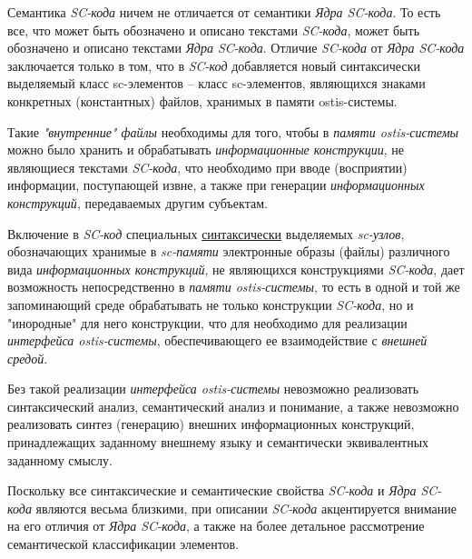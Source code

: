 \begin{SCn}
{{Семантика \textit{SC-кода} ничем не отличается от семантики \textit{Ядра SC-кода}. То есть все, что может быть обозначено и описано текстами \textit{SC-кода}, может быть обозначено и описано текстами \textit{Ядра SC-кода}. Отличие \textit{SC-кода} от \textit{Ядра SC-кода} заключается только в том, что в \textit{SC-код} добавляется новый синтаксически выделяемый класс sc-элементов -- класс sc-элементов, являющихся знаками конкретных (константных) файлов, хранимых в памяти ostis-системы. 

Такие \textit{"внутренние"{} файлы} необходимы для того, чтобы в \textit{памяти ostis-системы} можно было хранить и обрабатывать \textit{информационные конструкции}, не являющиеся текстами \textit{SC-кода}, что необходимо при вводе (восприятии) информации, поступающей извне, а также при генерации \textit{информационных конструкций}, передаваемых другим субъектам. 

Включение в \textit{SC-код} специальных \uline{синтаксически} выделяемых \textit{sc-узлов}, обозначающих хранимые в \textit{sc-памяти} электронные образы (файлы) различного вида \textit{информационных конструкций}, не являющихся конструкциями \textit{SC-кода}, дает возможность непосредственно в \textit{памяти ostis-системы}, то есть в одной и той же запоминающий среде обрабатывать не только конструкции \textit{SC-кода}, но и "инородные"{} для него конструкции, что для необходимо для реализации \textit{интерфейса ostis-системы}, обеспечивающего ее взаимодействие с \textit{внешней средой}. 

Без такой реализации \textit{интерфейса ostis-системы} невозможно реализовать синтаксический анализ, семантический анализ и понимание, а также невозможно реализовать синтез (генерацию) внешних информационных конструкций, принадлежащих заданному внешнему языку и семантически эквивалентных заданному смыслу. 

Поскольку все синтаксические и семантические свойства \textit{SC-кода} и \textit{Ядра SC-кода} являются весьма близкими, при описании \textit{SC-кода} акцентируется внимание на его отличия от \textit{Ядра SC-кода}, а также на более детальное рассмотрение семантической классификации элементов.
}

\scnendstruct {}

}
\end{SCn}
